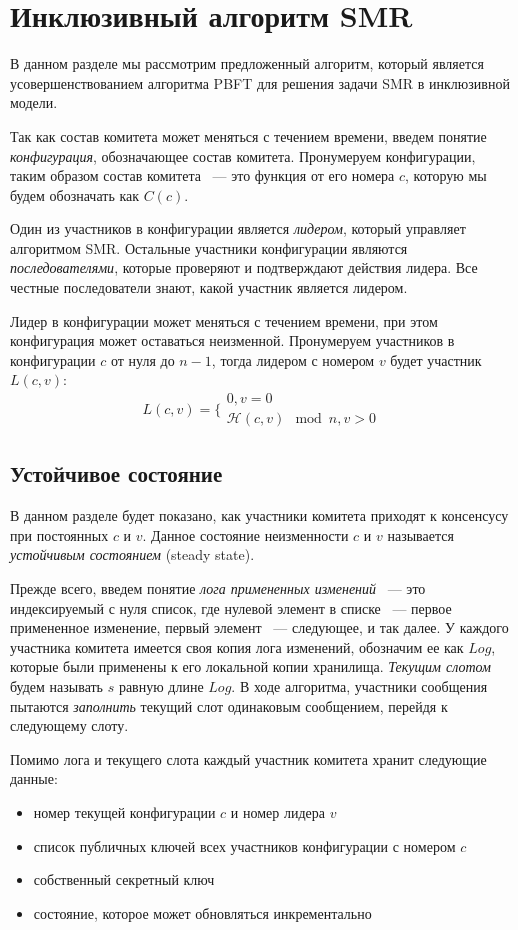 \section{Инклюзивный алгоритм SMR}
В данном разделе мы рассмотрим предложенный алгоритм, 
который является усовершенствованием алгоритма PBFT\cite{pbft} для решения задачи SMR в инклюзивной модели.
 
Так как состав комитета может меняться с течением времени, введем понятие \textit{конфигурация}, обозначающее состав комитета. Пронумеруем конфигурации, таким образом состав комитета ~--- это функция от его номера $c$, которую мы будем обозначать как $C(c)$. 
 
Один из участников в конфигурации является \textit{лидером}, который управляет алгоритмом SMR. 
Остальные участники конфигурации являются \textit{последователями}, которые проверяют и подтверждают действия лидера. Все честные последователи знают, какой участник является лидером.

Лидер в конфигурации может меняться с течением времени, при этом конфигурация может оставаться неизменной. Пронумеруем участников в конфигурации $c$ от нуля до $n-1$, тогда лидером с номером $v$ будет участник $L(c, v)$:
  \[
  L(c, v)=\Bigg\{ 
  \begin{array}{ll}
  0, v = 0\\
  \mathcal{H}(c, v) \mod n, v > 0 
  \end{array}
  \]

\subsection{Устойчивое состояние} \label{steady-state}
В данном разделе будет показано, как участники комитета приходят к консенсусу при постоянных $c$ и $v$. Данное состояние неизменности $c$ и $v$ называется \textit{устойчивым состоянием} (steady state).

Прежде всего, введем понятие \textit{лога примененных изменений} ~--- это индексируемый с нуля список, где нулевой элемент в списке ~--- первое примененное изменение, первый элемент ~--- следующее, и так далее. У каждого участника комитета имеется своя копия лога изменений, обозначим ее как $Log$, которые были применены к его локальной копии хранилища. \textit{Текущим слотом} будем называть $s$ равную длине $Log$. 
В ходе алгоритма, участники сообщения пытаются \textit{заполнить} текущий слот одинаковым сообщением, перейдя к следующему слоту.

Помимо лога и текущего слота каждый участник комитета хранит следующие данные:
\begin{itemize}
\item номер текущей конфигурации $c$ и номер лидера $v$
\item список публичных ключей всех участников конфигурации с номером $c$ 
\item собственный секретный ключ
\item состояние, которое может обновляться инкрементально
\end{itemize}

